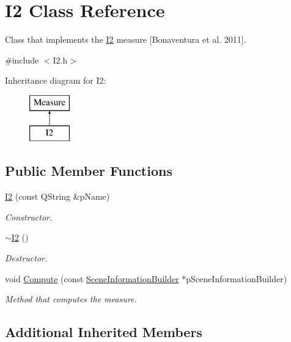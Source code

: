 \hypertarget{class_i2}{\section{I2 Class Reference}
\label{class_i2}
}


Class that implements the \hyperlink{class_i2}{I2} measure \mbox{[}Bonaventura et al. 2011\mbox{]}.  




{\ttfamily \#include $<$I2.\+h$>$}

Inheritance diagram for I2\+:\begin{figure}[H]
\begin{center}
\leavevmode
\includegraphics[height=2.000000cm]{class_i2}
\end{center}
\end{figure}
\subsection*{Public Member Functions}
\begin{DoxyCompactItemize}
\item 
\hyperlink{class_i2_a43a7a8316ca243246bc29ef6557a0a7f}{I2} (const Q\+String \&p\+Name)
\begin{DoxyCompactList}\small\item\em Constructor. \end{DoxyCompactList}\item 
\hyperlink{class_i2_a70b3fd2f637bfcd84fd0c407fe48cdab}{$\sim$\+I2} ()
\begin{DoxyCompactList}\small\item\em Destructor. \end{DoxyCompactList}\item 
void \hyperlink{class_i2_ac18f96cf65595707067a6e58870193cc}{Compute} (const \hyperlink{class_scene_information_builder}{Scene\+Information\+Builder} $\ast$p\+Scene\+Information\+Builder)
\begin{DoxyCompactList}\small\item\em Method that computes the measure. \end{DoxyCompactList}\end{DoxyCompactItemize}
\subsection*{Additional Inherited Members}



